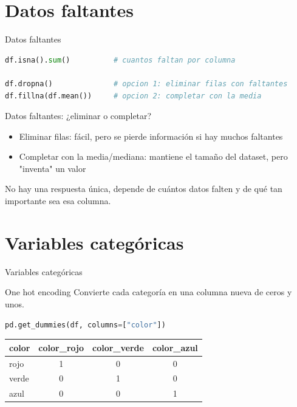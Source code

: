\section{Datos faltantes}

\begin{frame}[fragile]{Datos faltantes}
  \begin{lstlisting}[language=Python]
df.isna().sum()          # cuantos faltan por columna

df.dropna()              # opcion 1: eliminar filas con faltantes
df.fillna(df.mean())     # opcion 2: completar con la media
  \end{lstlisting}
\end{frame}

\begin{frame}{Datos faltantes: ¿eliminar o completar?}
  \begin{itemize}
    \item Eliminar filas: fácil, pero se pierde información si hay muchos faltantes
    \item Completar con la media/mediana: mantiene el tamaño del dataset, pero "inventa" un valor
  \end{itemize}
  \pause
  No hay una respuesta única, depende de cuántos datos falten y de qué
  tan importante sea esa columna.
\end{frame}

\section{Variables categóricas}

\begin{frame}{Variables categóricas}
\end{frame}

\begin{frame}[fragile]{One hot encoding}
  Convierte cada categoría en una columna nueva de ceros y unos.
  \begin{lstlisting}[language=Python]
pd.get_dummies(df, columns=["color"])
  \end{lstlisting}
  \begin{center}
  \begin{tabular}{lccc}
    \toprule
    color & color\_rojo & color\_verde & color\_azul \\
    \midrule
    rojo & 1 & 0 & 0 \\
    verde & 0 & 1 & 0 \\
    azul & 0 & 0 & 1 \\
    \bottomrule
  \end{tabular}
  \end{center}
\end{frame}

